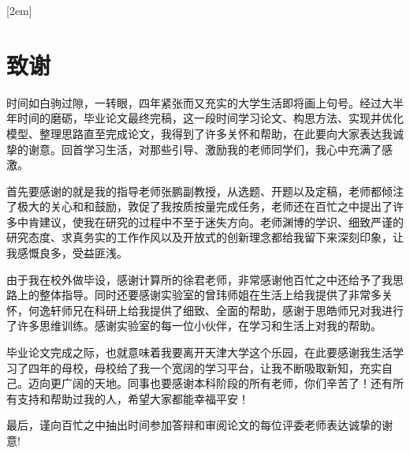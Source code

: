 
[2em]{\vspace{.5\baselineskip}\xiaosan\song}
             {\prechaptername\CJKnumber{\thecontentslabel}\postchaptername\qquad}{} 
             {}                            %
\lhead{}
\rhead{}
\lfoot{}
\cfoot{}
\rfoot{}
\chapter*{致\quad 谢}
\setcounter{page}{1}
时间如白驹过隙，一转眼，四年紧张而又充实的大学生活即将画上句号。经过大半年时间的磨砺，毕业论文最终完稿，这一段时间学习论文、构思方法、实现并优化模型、整理思路直至完成论文，我得到了许多关怀和帮助，在此要向大家表达我诚挚的谢意。回首学习生活，对那些引导、激励我的老师同学们，我心中充满了感激。

首先要感谢的就是我的指导老师张鹏副教授，从选题、开题以及定稿，老师都倾注了极大的关心和和鼓励，敦促了我按质按量完成任务，老师还在百忙之中提出了许多中肯建议，使我在研究的过程中不至于迷失方向。老师渊博的学识、细致严谨的研究态度、求真务实的工作作风以及开放式的创新理念都给我留下来深刻印象，让我感慨良多，受益匪浅。

由于我在校外做毕设，感谢计算所的徐君老师，非常感谢他百忙之中还给予了我思路上的整体指导。同时还要感谢实验室的曾玮师姐在生活上给我提供了非常多关怀，何逸轩师兄在科研上给我提供了细致、全面的帮助，感谢于思皓师兄对我进行了许多思维训练。感谢实验室的每一位小伙伴，在学习和生活上对我的帮助。

毕业论文完成之际，也就意味着我要离开天津大学这个乐园，在此要感谢我生活学习了四年的母校，母校给了我一个宽阔的学习平台，让我不断吸取新知，充实自己。迈向更广阔的天地。同事也要感谢本科阶段的所有老师，你们辛苦了！还有所有支持和帮助过我的人，希望大家都能幸福平安！

最后，谨向百忙之中抽出时间参加答辩和审阅论文的每位评委老师表达诚挚的谢意!


